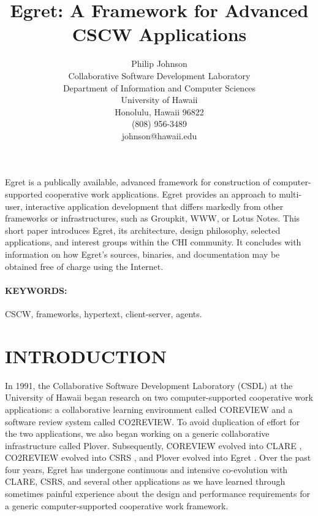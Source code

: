 


\title{Egret: A Framework for Advanced CSCW Applications}

\author{
Philip Johnson\\
Collaborative Software Development Laboratory\\
Department of Information and Computer Sciences\\
University of Hawaii\\
Honolulu, Hawaii 96822\\
(808) 956-3489\\
johnson@hawaii.edu}

\maketitle

\abstract 

Egret is a publically available, advanced framework for construction of
computer-supported cooperative work applications.  Egret provides an
approach to multi-user, interactive application development that differs
markedly from other frameworks or infrastructures, such as Groupkit, WWW,
or Lotus Notes.  This short paper introduces Egret, its architecture,
design philosophy, selected applications, and interest groups within the
CHI community. It concludes with information on how Egret's sources,
binaries, and documentation may be obtained free of charge using the
Internet.


\paragraph{KEYWORDS:} CSCW, frameworks, hypertext, client-server, agents.

\section{INTRODUCTION}

In 1991, the Collaborative Software Development Laboratory (CSDL) at the
University of Hawaii began research on two computer-supported cooperative
work applications: a collaborative learning environment called COREVIEW and
a software review system called CO2REVIEW.  To avoid duplication of effort
for the two applications, we also began working on a generic collaborative
infrastructure called Plover.  Subsequently, COREVIEW evolved into CLARE
\cite{csdl-94-04}, CO2\-REVIEW evolved into CSRS \cite{csdl-93-17}, and
Plover evolved into Egret \cite{csdl-93-09}.  Over the past four years,
Egret has undergone continuous and intensive co-evolution with CLARE, CSRS,
and several other applications as we have learned through sometimes painful
experience about the design and performance requirements for a generic
computer-supported cooperative work framework.

